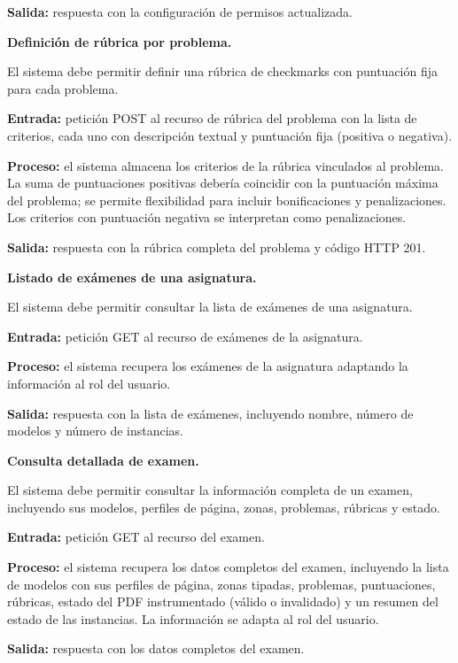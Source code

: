 \begin{functional}
\begin{functional}
    \textbf{Salida:} respuesta con la configuración de permisos actualizada.

    \item \textbf{Definición de rúbrica por problema.}

    El sistema debe permitir definir una rúbrica de checkmarks con puntuación fija para cada problema.

    \textbf{Entrada:} petición POST al recurso de rúbrica del problema con la lista de criterios, cada uno con descripción textual y puntuación fija (positiva o negativa).

    \textbf{Proceso:} el sistema almacena los criterios de la rúbrica vinculados al problema. La suma de puntuaciones positivas debería coincidir con la puntuación máxima del problema; se permite flexibilidad para incluir bonificaciones y penalizaciones. Los criterios con puntuación negativa se interpretan como penalizaciones.

    \textbf{Salida:} respuesta con la rúbrica completa del problema y código HTTP 201.

    \item \textbf{Listado de exámenes de una asignatura.}

    El sistema debe permitir consultar la lista de exámenes de una asignatura.

    \textbf{Entrada:} petición GET al recurso de exámenes de la asignatura.

    \textbf{Proceso:} el sistema recupera los exámenes de la asignatura adaptando la información al rol del usuario.

    \textbf{Salida:} respuesta con la lista de exámenes, incluyendo nombre, número de modelos y número de instancias.

    \item \textbf{Consulta detallada de examen.}

    El sistema debe permitir consultar la información completa de un examen, incluyendo sus modelos, perfiles de página, zonas, problemas, rúbricas y estado.

    \textbf{Entrada:} petición GET al recurso del examen.

    \textbf{Proceso:} el sistema recupera los datos completos del examen, incluyendo la lista de modelos con sus perfiles de página, zonas tipadas, problemas, puntuaciones, rúbricas, estado del PDF instrumentado (válido o invalidado) y un resumen del estado de las instancias. La información se adapta al rol del usuario.

    \textbf{Salida:} respuesta con los datos completos del examen.


\end{functional}
\end{functional}

